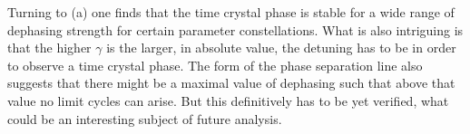     Turning to (a) one finds that the time crystal phase is stable for a wide range of dephasing strength for certain parameter constellations. What is also intriguing is that the higher $\gamma$ is the larger, in absolute value, the detuning has to be in order to observe a time crystal phase. The form of the phase separation line also suggests that there might be a maximal value of dephasing such that above that value no limit cycles can arise. But this definitively has to be yet verified, what could be an interesting subject of future analysis.




